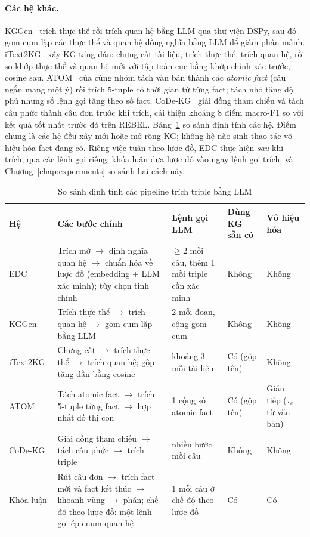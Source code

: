 \paragraph*{Các hệ khác.}
KGGen~\cite{mo2025kggen} trích thực thể rồi trích quan hệ bằng LLM qua thư viện DSPy, sau đó gom cụm lặp các thực thể và quan hệ đồng nghĩa bằng LLM để giảm phân mảnh.
iText2KG~\cite{lairgi2024itext2kg} xây KG tăng dần: chưng cất tài liệu, trích thực thể, trích quan hệ, rồi so khớp thực thể và quan hệ mới với tập toàn cục bằng khớp chính xác trước, cosine sau.
ATOM~\cite{lairgi2025atom} của cùng nhóm tách văn bản thành các \textit{atomic fact} (câu ngắn mang một ý) rồi trích 5-tuple có thời gian từ từng fact; tách nhỏ tăng độ phủ nhưng số lệnh gọi tăng theo số fact.
CoDe-KG~\cite{codekg2025} giải đồng tham chiếu và tách câu phức thành câu đơn trước khi trích, cải thiện khoảng 8 điểm macro-F1 so với kết quả tốt nhất trước đó trên REBEL.
Bảng~\ref{tab:ie-pipelines} so sánh định tính các hệ.
Điểm chung là các hệ đều xây mới hoặc mở rộng KG; không hệ nào sinh thao tác vô hiệu hóa fact đang có.
Riêng việc tuân theo lược đồ, EDC thực hiện \emph{sau} khi trích, qua các lệnh gọi riêng; khóa luận đưa lược đồ vào ngay lệnh gọi trích, và Chương~\ref{chap:experiments} so sánh hai cách này.

\begin{table}[htbp]
\centering
\caption{So sánh định tính các pipeline trích triple bằng LLM}
\label{tab:ie-pipelines}
\small
\setlength{\tabcolsep}{4pt}
\renewcommand{\arraystretch}{1.2}
\begin{tabular}{@{}p{1.7cm}p{6.0cm}p{3.0cm}p{1.9cm}p{2.0cm}@{}}
\toprule
Hệ & Các bước chính & Lệnh gọi LLM & Dùng KG sẵn có & Vô hiệu hóa \\
\midrule
EDC~\cite{zhang2024edc} & Trích mở $\to$ định nghĩa quan hệ $\to$ chuẩn hóa về lược đồ (embedding + LLM xác minh); tùy chọn tinh chỉnh & $\geq 2$ mỗi câu, thêm 1 mỗi triple cần xác minh & Không & Không \\
KGGen~\cite{mo2025kggen} & Trích thực thể $\to$ trích quan hệ $\to$ gom cụm lặp bằng LLM & 2 mỗi đoạn, cộng gom cụm & Không & Không \\
iText2KG~\cite{lairgi2024itext2kg} & Chưng cất $\to$ trích thực thể $\to$ trích quan hệ; gộp tăng dần bằng cosine & khoảng 3 mỗi tài liệu & Có (gộp tên) & Không \\
ATOM~\cite{lairgi2025atom} & Tách atomic fact $\to$ trích 5-tuple từng fact $\to$ hợp nhất đồ thị con & 1 cộng số atomic fact & Có (gộp tên) & Gián tiếp ($\tau_e$ từ văn bản) \\
CoDe-KG~\cite{codekg2025} & Giải đồng tham chiếu $\to$ tách câu phức $\to$ trích triple & nhiều bước mỗi câu & Không & Không \\
\midrule
Khóa luận & Rút câu đơn $\to$ trích fact mới và fact kết thúc $\to$ khoanh vùng $\to$ phán; chế độ theo lược đồ: một lệnh gọi ép enum quan hệ & 1 mỗi câu ở chế độ theo lược đồ & Có & Có \\
\bottomrule
\end{tabular}
\end{table}


